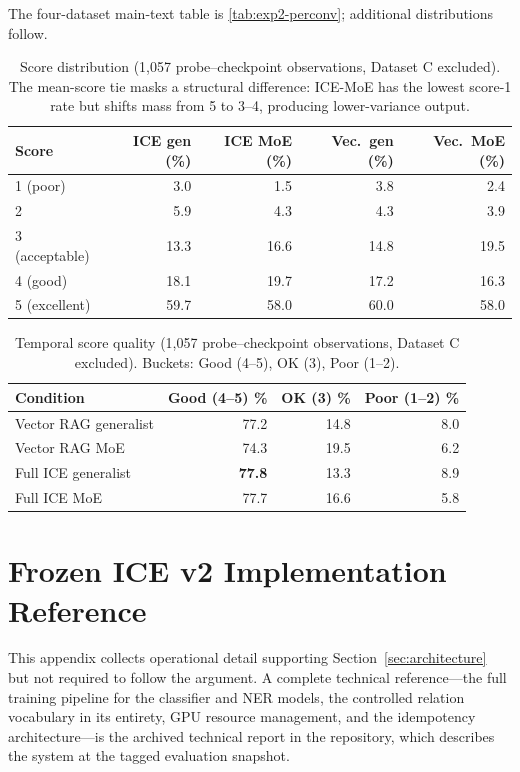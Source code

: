 \documentclass[11pt,a4paper]{article}
\begin{document}
The four-dataset main-text table is \cref{tab:exp2-perconv}; additional distributions follow.

\begin{table}[htbp]
\centering
\small
\caption{Score distribution (1{,}057 probe--checkpoint observations, Dataset C excluded). The mean-score tie masks a structural difference: ICE-MoE has the lowest score-1 rate but shifts mass from 5 to 3--4, producing lower-variance output.}
\label{tab:exp2-score-dist}
\begin{tabular}{@{}lrrrr@{}}
\toprule
\textbf{Score} & \textbf{ICE gen (\%)} & \textbf{ICE MoE (\%)} & \textbf{Vec.\ gen (\%)} & \textbf{Vec.\ MoE (\%)} \\
\midrule
1 (poor)       & 3.0 & 1.5 & 3.8 & 2.4 \\
2              & 5.9 & 4.3 & 4.3 & 3.9 \\
3 (acceptable) & 13.3 & 16.6 & 14.8 & 19.5 \\
4 (good)       & 18.1 & 19.7 & 17.2 & 16.3 \\
5 (excellent)  & 59.7 & 58.0 & 60.0 & 58.0 \\
\bottomrule
\end{tabular}
\end{table}

\begin{table}[htbp]
\centering
\small
\caption{Temporal score quality (1{,}057 probe--checkpoint observations, Dataset C excluded). Buckets: Good (4--5), OK (3), Poor (1--2).}
\label{tab:exp2-temporal}
\begin{tabular}{@{}lrrr@{}}
\toprule
\textbf{Condition} & \textbf{Good (4--5) \%} & \textbf{OK (3) \%} & \textbf{Poor (1--2) \%} \\
\midrule
Vector RAG generalist  & 77.2 & 14.8 & 8.0 \\
Vector RAG MoE         & 74.3 & 19.5 & 6.2 \\
Full ICE generalist    & \textbf{77.8} & 13.3 & 8.9 \\
Full ICE MoE           & 77.7 & 16.6 & 5.8 \\
\bottomrule
\end{tabular}
\end{table}

\FloatBarrier
\section{Frozen ICE v2 Implementation Reference}
\label{app:implementation}

This appendix collects operational detail supporting Section~\ref{sec:architecture} but not required to follow the argument. A complete technical reference---the full training pipeline for the classifier and NER models, the controlled relation vocabulary in its entirety, GPU resource management, and the idempotency architecture---is the archived technical report in the repository, which describes the system at the tagged evaluation snapshot.
\end{document}
